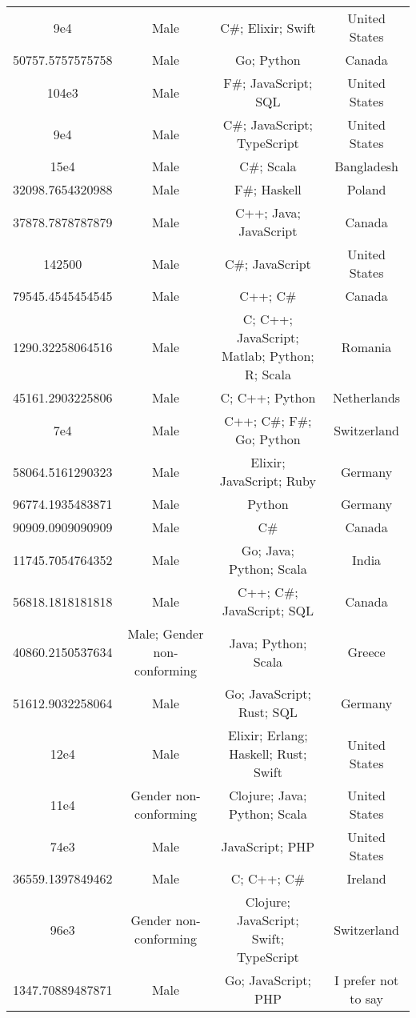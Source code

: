 \begin{center}
\begin{tabular}{ |c|c|c|c| }
9e4  &  Male  &  C\#; Elixir; Swift  &  United States  \\ 
50757.5757575758  &  Male  &  Go; Python  &  Canada  \\ 
104e3  &  Male  &  F\#; JavaScript; SQL  &  United States  \\ 
9e4  &  Male  &  C\#; JavaScript; TypeScript  &  United States  \\ 
15e4  &  Male  &  C\#; Scala  &  Bangladesh  \\ 
32098.7654320988  &  Male  &  F\#; Haskell  &  Poland  \\ 
37878.7878787879  &  Male  &  C++; Java; JavaScript  &  Canada  \\ 
142500  &  Male  &  C\#; JavaScript  &  United States  \\ 
79545.4545454545  &  Male  &  C++; C\#  &  Canada  \\ 
1290.32258064516  &  Male  &  C; C++; JavaScript; Matlab; Python; R; Scala  &  Romania  \\ 
45161.2903225806  &  Male  &  C; C++; Python  &  Netherlands  \\ 
7e4  &  Male  &  C++; C\#; F\#; Go; Python  &  Switzerland  \\ 
58064.5161290323  &  Male  &  Elixir; JavaScript; Ruby  &  Germany  \\ 
96774.1935483871  &  Male  &  Python  &  Germany  \\ 
90909.0909090909  &  Male  &  C\#  &  Canada  \\ 
11745.7054764352  &  Male  &  Go; Java; Python; Scala  &  India  \\ 
56818.1818181818  &  Male  &  C++; C\#; JavaScript; SQL  &  Canada  \\ 
40860.2150537634  &  Male; Gender non-conforming  &  Java; Python; Scala  &  Greece  \\ 
51612.9032258064  &  Male  &  Go; JavaScript; Rust; SQL  &  Germany  \\ 
12e4  &  Male  &  Elixir; Erlang; Haskell; Rust; Swift  &  United States  \\ 
11e4  &  Gender non-conforming  &  Clojure; Java; Python; Scala  &  United States  \\ 
74e3  &  Male  &  JavaScript; PHP  &  United States  \\ 
36559.1397849462  &  Male  &  C; C++; C\#  &  Ireland  \\ 
96e3  &  Gender non-conforming  &  Clojure; JavaScript; Swift; TypeScript  &  Switzerland  \\ 
1347.70889487871  &  Male  &  Go; JavaScript; PHP  &  I prefer not to say  \\ 

\end{tabular}
\end{center}
